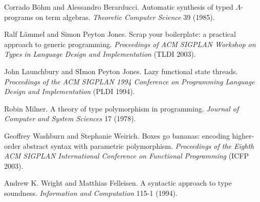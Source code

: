 \begin{thebibliography}{99}

Corrado B\"ohm and Alessandro Berarducci.
Automatic synthesis of typed $\Lambda$-programs on term algebras.
\emph{Theoretic Computer Science} 39 (1985).

Ralf L\"ammel and Simon Peyton Jones.
Scrap your boilerplate: a practical approach to generic
programming.
\emph{Proceedings of ACM SIGPLAN Workshop on Types in Language
Design and Implementation} (TLDI 2003).

John Launchbury and SImon Peyton Jones.
Lazy functional state threads.
\emph{Proceedings of the ACM SIGPLAN 1994 Conference on
Programming Language Design and Implementation} (PLDI 1994).

Robin Milner.
A theory of type polymorphism in programming.
\emph{Journal of Computer and System Sciences} 17 (1978).

Geoffrey Washburn and Stephanie Weirich.
Boxes go bananas: encoding higher-order abstract syntax with
parametric polymorphism.
\emph{Proceedings of the Eighth ACM SIGPLAN International
Conference on Functional Programming} (ICFP 2003).

Andrew K. Wright and Matthias Felleisen.
A syntactic approach to type soundness.
\emph{Information and Computation} 115-1 (1994).
\end{thebibliography}
